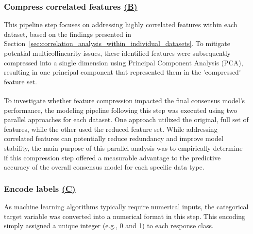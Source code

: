 \documentclass[12pt,a4paper]{report}
\begin{document}
\subsubsection*{Compress correlated features \hyperref[fig:pipeline-1]{(B)}}
This pipeline step focuses on addressing highly correlated features within each dataset, based on the findings presented in Section~\ref{sec:correlation_analysis_within_individual_datasets}. To mitigate potential multicollinearity issues, these identified features were subsequently compressed into a single dimension using Principal Component Analysis (PCA), resulting in one principal component that represented them in the 'compressed' feature set.\\
\\
To investigate whether feature compression impacted the final consensus model's performance, the modeling pipeline following this step was executed using two parallel approaches for each dataset. One approach utilized the original, full set of features, while the other used the reduced feature set. While addressing correlated features can potentially reduce redundancy and improve model stability, the main purpose of this parallel analysis was to empirically determine if this compression step offered a measurable advantage to the predictive accuracy of the overall consensus model for each specific data type.

\subsubsection*{Encode labels \hyperref[fig:pipeline-1]{(C)}}
As machine learning algorithms typically require numerical inputs, the categorical target variable was converted into a numerical format in this step. This encoding simply assigned a unique integer (e.g., 0 and 1) to each response class.
\end{document}
